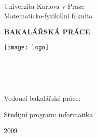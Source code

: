 \begin{titlepage}
\begin{center}

{ \large
Univerzita Karlova v Praze\\
Matematicko-fyzikální fakulta\\
}

\vspace{10mm}

{\Large\bf BAKALÁŘSKÁ PRÁCE}

\vfill

\texttt{[image: logo]} 

\vfill

{\Large \bcAuthor}\\ %
\vspace{5mm}
{\Large\bf \bcTitle}\\ %
\vspace{5mm}
\bcKSVI\\ %
\end{center}
\vfill

\large
\noindent Vedoucí bakalářské práce: \bcTeacher %
\vspace{1mm} 

\noindent Studijní program: informatika %

\vspace{20mm}

\begin{center}
2009 %
\end{center}

\end{titlepage} %

\normalsize %
\setcounter{page}{2} %
\cleardoublepage

